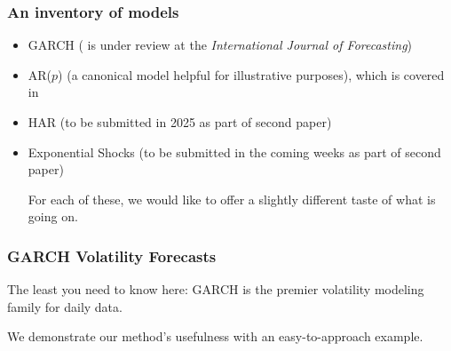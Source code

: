 \documentclass[9pt]{beamer}
\theoremstyle{definition}
\begin{document}
\begin{frame}
    \frametitle{An inventory of models}

    \begin{itemize}
        \item <1-> GARCH (\cite{lundquist2024volatility} is under review at the \textit{International Journal of Forecasting})
        \item <2-> AR($p$) (a canonical model helpful for illustrative purposes), which is covered in \cite{lin2021minimizing}
        \item <3-> HAR (to be submitted in 2025 as part of second paper)
        \item <4-> Exponential Shocks (to be submitted in the coming weeks as part of second paper)

        For each of these, we would like to offer a slightly different taste of what is going on.
    \end{itemize}
\end{frame}

\begin{frame}
    \frametitle{GARCH Volatility Forecasts}
    The least you need to know here: GARCH is the premier volatility modeling family for daily data.

    \bigskip

    We demonstrate our method's usefulness with an easy-to-approach example.
\end{frame}




    
\end{document}
